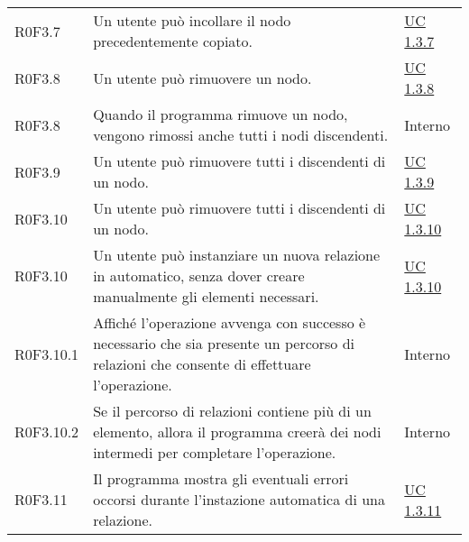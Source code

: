 \begin{center}
\begin{longtable}{p{4.2cm}!{\color{white}\vrule width 0.5mm}p{6cm}!{\color{white}\vrule width 0.5mm}p{2.5cm}!{\color{white}\vrule width 0.5mm}}
			\hspace{2mm}\hypertarget{XER0F3.7}{R0F3.7} & Un utente può incollare il nodo precedentemente copiato. & \hyperref[subsec:XEUC1.3.7]{UC 1.3.7}\\
	
			\hspace{2mm}\hypertarget{XER0F3.8}{R0F3.8} & Un utente può rimuovere un nodo. & \hyperref[subsec:XEUC1.3.8]{UC 1.3.8}\\
				
				\hspace{4mm}\hypertarget{XER0F3.8}{R0F3.8} & Quando il programma rimuove un nodo, vengono rimossi anche tutti i nodi discendenti. & Interno\\
	
			\hspace{2mm}\hypertarget{XER0F3.9}{R0F3.9} & Un utente può rimuovere tutti i discendenti di un nodo. & \hyperref[subsec:XEUC1.3.9]{UC 1.3.9}\\
	
			\hspace{2mm}\hypertarget{XER0F3.10}{R0F3.10} & Un utente può rimuovere tutti i discendenti di un nodo. & \hyperref[subsec:XEUC1.3.10]{UC 1.3.10}\\
			
			\hspace{2mm}\hypertarget{XER0F3.10}{R0F3.10} & Un utente può instanziare un nuova relazione in automatico, senza dover creare manualmente gli elementi necessari. & \hyperref[subsec:XEUC1.3.10]{UC 1.3.10}\\
			
				\hspace{4mm}\hypertarget{XER0F3.10.1}{R0F3.10.1} & Affiché l'operazione avvenga con successo è necessario che sia presente un percorso di relazioni che consente di effettuare l'operazione. & Interno\\
	
				\hspace{4mm}\hypertarget{XER0F3.10.2}{R0F3.10.2} & Se il percorso di relazioni contiene più di un elemento, allora il programma creerà dei nodi intermedi per completare l'operazione. & Interno\\
	
			\hspace{2mm}\hypertarget{XER0F3.11}{R0F3.11} & Il programma mostra gli eventuali errori occorsi durante l'instazione automatica di una relazione. & \hyperref[subsec:XEUC1.3.11]{UC 1.3.11}\\
	

\end{longtable}
\end{center}
